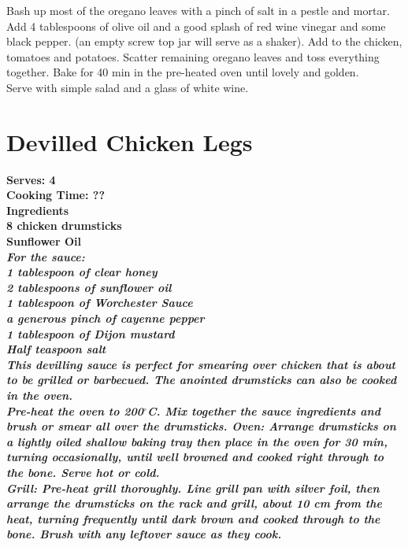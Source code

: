 \documentclass[18pt, oneside]{book}
\begin{document}
Bash up most of the oregano leaves with a pinch of salt in a pestle and mortar. Add 4 tablespoons of olive oil and a good splash of red wine vinegar and some black pepper. (an empty screw top jar will serve as a shaker). Add to the chicken, tomatoes and potatoes. Scatter remaining oregano leaves and toss everything together. Bake for 40 
min in the pre-heated oven until lovely and golden. \\

Serve with simple salad and a glass of white wine.

\section{Devilled Chicken Legs}


\bf{Serves: 4} \\
\bf{Cooking Time: ??} \\

\bf{Ingredients} \normalfont \\
8 chicken drumsticks \\
Sunflower Oil \\

\it{For the sauce}: \normalfont \\
1 tablespoon of clear honey \\
2 tablespoons of sunflower oil \\
1 tablespoon of Worchester Sauce \\
a generous pinch of cayenne pepper \\
1 tablespoon of Dijon mustard \\
Half teaspoon salt \\

This devilling sauce is perfect for smearing over chicken that is about to be grilled or barbecued. The anointed drumsticks can also be cooked in the oven. \\

Pre-heat the oven to 200$^{\circ}$C. Mix together the sauce ingredients and brush or smear all over the drumsticks. Oven: Arrange drumsticks on a lightly oiled shallow baking tray then place in the oven for 30 min, turning occasionally, until well browned and cooked right through to the bone. Serve hot or cold.\\

Grill: Pre-heat grill thoroughly. Line grill pan with silver foil, then arrange the drumsticks on the rack and grill, about 10 cm from the heat, turning frequently until dark brown and cooked through to the bone. Brush with any leftover sauce as they cook.
\end{document}
